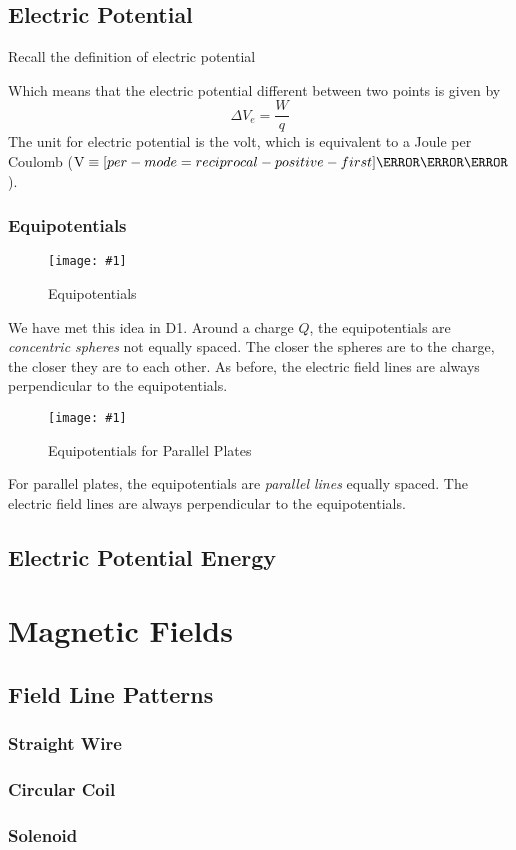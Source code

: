 \documentclass[a4paper,12pt]{article}
\let\oldsection\section
\renewcommand\section{\clearpage\oldsection}
\let\oldsi\si
\renewcommand{\si}[1]{\oldsi[per-mode=reciprocal-positive-first]{#1}}
\newcommand{\lb}{\\[8pt]}
\newcommand{\img}[4]{\begin{center}
  \begin{figure}[H]
    \centering
    \texttt{[image: \#1]}
    \caption{#3}
    \label{fig:#4}
  \end{figure}
\end{center}}
\begin{document}
\pagebreak

\subsection{Electric Potential}

Recall the definition of electric potential
\begin{center}
\end{center}
Which means that the electric potential different between two points is given by
\begin{equation}\label{eq:potential}
  \Delta V_e = \frac{W}{q}
\end{equation}
The unit for electric potential is the volt, which is equivalent to a Joule per Coulomb ($\text{V} \equiv \si{\J\per\C}$).\lb

\subsubsection{Equipotentials}

\begin{minipage}{0.45\textwidth}
  \img{sphereequipotential.png}{1}{Equipotentials}{sphereequipotential}

  We have met this idea in D1. Around a charge $Q$, the equipotentials are \textit{concentric spheres} not equally spaced. The closer the spheres are to the charge, the closer they are to each other. As before, the electric field lines are always perpendicular to the equipotentials.
\end{minipage}\hspace*{0.1\textwidth}
\begin{minipage}{0.45\textwidth}
  \img{platesequipotential.png}{1}{Equipotentials for Parallel Plates}{platesequipotential}

  For parallel plates, the equipotentials are \textit{parallel lines} equally spaced. The electric field lines are always perpendicular to the equipotentials.
\end{minipage}


\subsection{Electric Potential Energy}

\section{Magnetic Fields}

\subsection{Field Line Patterns}

\subsubsection{Straight Wire}

\subsubsection{Circular Coil}

\subsubsection{Solenoid}
\end{document}
